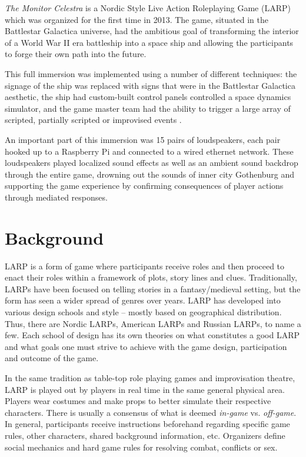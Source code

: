 \emph{The Monitor Celestra} is a Nordic Style Live Action Roleplaying Game (LARP) which was organized for the first time in 2013. 
The game, situated
in the Battlestar Galactica\cite{larson_battlestar_1978} universe, had the ambitious goal of
transforming the interior of a World War II era battleship into a
space ship and allowing the participants to forge their own path into the future. 

This full immersion was implemented using a number of different techniques: the signage of the ship was replaced with signs that were
in the Battlestar Galactica aesthetic, the ship
had custom-built control panels controlled a space dynamics simulator, and the game
master team had the ability to trigger a large array of scripted, partially scripted or improvised events .

An important part of this immersion was 15 pairs of
loudspeakers, each pair hooked up to a Raspberry Pi\cite{rpi} and
connected to a wired ethernet network. These loudspeakers played
localized sound effects as well as an ambient sound backdrop through
the entire game, drowning out the sounds of inner city Gothenburg and
supporting the game experience by confirming consequences of player
actions through mediated responses.

\section{Background}
\label{sec:background}

LARP is a form of game where participants receive roles and then proceed to enact their roles within a framework of plots, story lines and clues. Traditionally, LARPs have been focused on telling stories in a fantasy/medieval setting, but the form has seen a wider spread of genres over years. LARP has developed into various design schools and style -- mostly based on geographical distribution. Thus, there are Nordic LARPs, American LARPs and Russian LARPs, to name a few\cite{kp2011}. Each school of design has its own theories on what constitutes a good LARP and what goals one must strive to achieve with the game design, participation and outcome of the game.

In the same tradition as table-top role playing games and improvisation theatre, LARP is played out by players in real time in the same general physical area. Players wear costumes and make props to better simulate their respective characters. There is usually a consensus of what is deemed \emph{in-game} vs. \emph{off-game}.  In general, participants receive instructions beforehand regarding specific game rules, other characters, shared background information, etc. Organizers define social mechanics and hard game rules for resolving combat, conflicts or sex. 

